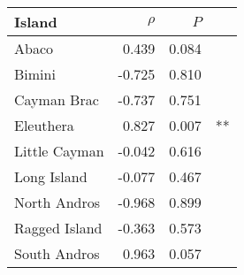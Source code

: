 
\begin{tabular}{lrrl}
\toprule
Island & $\rho$ & $P$ & \\
\midrule
Abaco & 0.439 & 0.084 & \\
Bimini & -0.725 & 0.810 & \\
Cayman Brac & -0.737 & 0.751 & \\
Eleuthera & 0.827 & 0.007 & **\\
Little Cayman & -0.042 & 0.616 & \\
Long Island & -0.077 & 0.467 & \\
North Andros & -0.968 & 0.899 & \\
Ragged Island & -0.363 & 0.573 & \\
South Andros & 0.963 & 0.057 & \\
\bottomrule
\end{tabular}